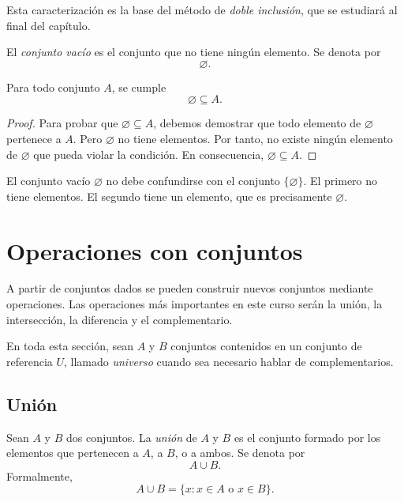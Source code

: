 Esta caracterización es la base del método de \emph{doble inclusión}, que se estudiará al final del capítulo.

\begin{definicion}
El \emph{conjunto vacío} es el conjunto que no tiene ningún elemento. Se denota por
\[
  \varnothing.
\]
\end{definicion}

\begin{proposicion}
Para todo conjunto \(A\), se cumple
\[
  \varnothing\subseteq A.
\]
\end{proposicion}

\begin{proof}
Para probar que \(\varnothing\subseteq A\), debemos demostrar que todo elemento de \(\varnothing\) pertenece a \(A\). Pero \(\varnothing\) no tiene elementos. Por tanto, no existe ningún elemento de \(\varnothing\) que pueda violar la condición. En consecuencia, \(\varnothing\subseteq A\).
\end{proof}

\begin{advertencia}
El conjunto vacío \(\varnothing\) no debe confundirse con el conjunto \(\{\varnothing\}\). El primero no tiene elementos. El segundo tiene un elemento, que es precisamente \(\varnothing\).
\end{advertencia}

\section{Operaciones con conjuntos}

A partir de conjuntos dados se pueden construir nuevos conjuntos mediante operaciones. Las operaciones más importantes en este curso serán la unión, la intersección, la diferencia y el complementario.

En toda esta sección, sean \(A\) y \(B\) conjuntos contenidos en un conjunto de referencia \(U\), llamado \emph{universo} cuando sea necesario hablar de complementarios.

\subsection{Unión}

\begin{definicion}[Unión]
Sean \(A\) y \(B\) dos conjuntos. La \emph{unión} de \(A\) y \(B\) es el conjunto formado por los elementos que pertenecen a \(A\), a \(B\), o a ambos. Se denota por
\[
  A\cup B.
\]
Formalmente,
\[
  A\cup B = \{x : x\in A \text{ o } x\in B\}.
\]
\end{definicion}


